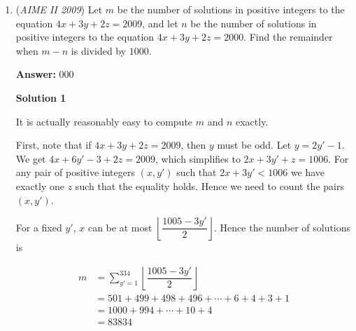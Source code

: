 \begin{enumerate}
 $P(a=b)=\frac{1}{36}\left(1+\left(\frac{5}{6}\right)^2+\left(\frac{5}{6}\right)^4+\cdots\right)$
$=\frac{1}{36}\left(\frac{1}{1-\left(\frac{5}{6}\right)^2}\right)=\frac{1}{36}\left(\frac{36}{11}\right)=\frac{1}{11}.$

 2. If $a=b+1$, then

 $P(a=b+1)=\frac{1}{36}\left(\frac{5}{6}+\left(\frac{5}{6}\right)^3+\left(\frac{5}{6}\right)^5+\cdots\right)$
$=\frac{5}{216}\left(1+\left(\frac{5}{6}\right)^2+\left(\frac{5}{6}\right)^4+\cdots\right)$
$=\frac{5}{216}\left(\frac{36}{11}\right)=\frac{5}{66}.$

 By symmetry,

 3. $P(a=b-1)=\frac{5}{66}.$

 Therefore,

 $P(|a-b|\leq1)=\frac{1}{11}+\frac{5}{66}+\frac{5}{66}=\frac{8}{33}.$

 Thus, the answer is $\boxed{041}$.

 


	\item (\textit{AIME II 2009}) Let $m$ be the number of solutions in positive integers to the equation $4x+3y+2z=2009$, and let $n$ be the number of solutions in positive integers to the equation $4x+3y+2z=2000$. Find the remainder when $m-n$ is divided by $1000$.


 
 \textbf{Answer: }000



\textbf{Solution 1}

It is actually reasonably easy to compute $m$ and $n$ exactly.

 First, note that if $4x+3y+2z=2009$, then $y$ must be odd. Let $y=2y'-1$. We get $4x + 6y' - 3 + 2z = 2009$, which simplifies to $2x + 3y' + z = 1006$. For any pair of positive integers $(x,y')$ such that $2x + 3y' < 1006$ we have exactly one $z$ such that the equality holds. Hence we need to count the pairs $(x,y')$. 

 For a fixed $y'$, $x$ can be at most $\left\lfloor \dfrac{1005-3y'}2 \right\rfloor$. Hence the number of solutions is 

 
 \begin{align*} m & = \sum_{y'=1}^{334} \left\lfloor \dfrac{1005-3y'}2 \right\rfloor  \\ & =  501 + 499 + 498 + 496 + \cdots + 6 + 4 + 3 + 1  \\ & = 1000 + 994 + \cdots + 10 + 4 \\ & = 83834 \end{align*}



\end{enumerate}
